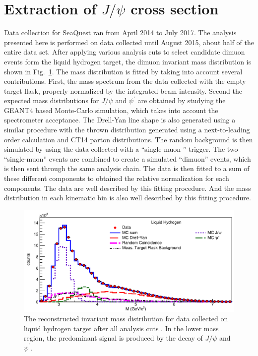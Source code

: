 \documentclass[10pt, a4paper,final]{article}
\begin{document}
\section{Extraction of \texorpdfstring{$J/\psi$}{J/psi} cross section}
\label{sec:result}
Data collection for SeaQuest ran from April 2014 to July 2017. The analysis
presented here is performed on data collected until August 2015, about half
of the entire data set. After applying various analysis cuts to select
candidate dimuon events form the liquid hydrogen target, the dimuon invariant
mass distribution is shown in Fig.~\ref{fig:mass}. The mass distribution is
fitted by taking into account several contributions. First, the mass spectrum
from the data collected with the empty target flask, properly normalized by
the integrated beam intensity. Second the expected mass distributions for
$J/\psi$ and $\psi^\prime$ are  obtained by studying the GEANT4 based Monte-Carlo
simulation, which takes into account the spectrometer acceptance. The Drell-Yan
line shape is also generated using a similar procedure with the thrown distribution
generated using a next-to-leading order calculation and CT14 parton distributions.
The random background is then simulated by using the data collected with a
``single-muon '' trigger. The two ``single-muon'' events are combined to
create a simulated ``dimuon'' events, which is then sent through the same
analysis chain. The data is then fitted to a sum of these different
components to obtained the relative normalization for each components. The
data are well described by this fitting procedure. And the mass distribution
in each kinematic bin is also well described by this fitting procedure.

\begin{figure}[htbp!]
	\centering
	\includegraphics[width=0.65\linewidth]{extFig3_LH2}
	\caption{The reconstructed invariant mass distribution for data collected on
		liquid hydrogen target after all analysis cuts \cite{dove2021}.
		In the lower mass region, the predominant signal is produced by the decay
		of $J/\psi$ and $\psi^\prime$. }
	\label{fig:mass}
\end{figure}
\end{document}
